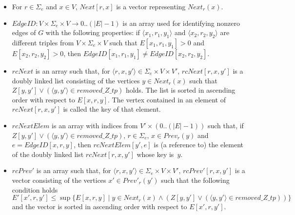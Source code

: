 \documentclass[11pt]{article}
\def\tuple#1{\langle#1\rangle}
\newcommand{\SE}{\Sigma_e}
\newcommand{\Next}{\mathit{Next}}
\newcommand{\Prev}{\mathit{Prev}}
\newcommand{\PrevP}{\mathit{Prev}'}
\newcommand{\removeZ}{\textit{removed\_Z\_tp}}
\newcommand{\EdgeID}{\mathit{EdgeID}}
\newcommand{\rcNext}{\mathit{rcNext}}
\newcommand{\rcPrevP}{\mathit{rcPrev}'}
\newcommand{\rcNextElem}{\mathit{rcNextElem}}
\begin{document}
\begin{itemize}
\item For $r \in \SE$ and $x \in V$, $\Next[r,x]$ is a vector representing $\Next_r(x)$. 

\item $\EdgeID : V \times \SE \times V \to 0..(|E|-1)$ is an array used for identifying nonzero edges of $G$ with the following properties: if $\tuple{x_1,r_1,y_1}$ and $\tuple{x_2,r_2,y_2}$ are different triples from $V \times \SE \times V$ such that $E[x_1,r_1,y_1] > 0$ and $E[x_2,r_2,y_2] > 0$, then $\EdgeID[x_1,r_1,y_1] \neq \EdgeID[x_2,r_2,y_2]$. 

\item $\rcNext$ is an array such that, for $\tuple{r,x,y'} \in \SE \times V \times V'$, $\rcNext[r,x,y']$ is a doubly linked list consisting of the vertices $y \in \Next_r(x)$ such that $Z[y,y'] \lor (\tuple{y,y'} \in \removeZ)$ holds. The list is sorted in ascending order with respect to $E[x,r,y]$. The vertex contained in an element of $\rcNext[r,x,y']$ is called the key of that element. 
	
\item $\rcNextElem$ is an array with indices from $V' \times (0..(|E|-1))$ such that, if $Z[y,y'] \lor (\tuple{y,y'} \in \removeZ)$, $r \in \SE$, $x \in \Prev_r(y)$ and $e = \EdgeID[x,r,y]$, then $\rcNextElem[y',e]$ is (a reference to) the element of the doubly linked list $\rcNext[r,x,y']$ whose key is~$y$. 
	
\item $\rcPrevP$ is an array such that, for $\tuple{r,x,y'} \in \SE \times V \times V'$, $\rcPrevP[r,x,y']$ is a vector consisting of the vertices $x' \in \PrevP_r(y')$ such that the following condition holds 
	\begin{equation}
	E'[x',r,y'] \leq \sup \{E[x,r,y] \mid y \in \Next_r(x) \land (Z[y,y'] \lor (\tuple{y,y'} \in \removeZ))\}
	\end{equation}
and the vector is sorted in ascending order with respect to $E[x',r,y']$. 
\end{itemize}
\end{document}
